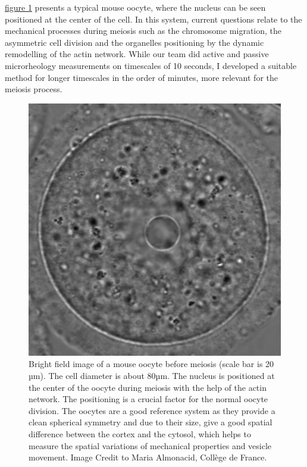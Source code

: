 \documentclass[A4paperpaper,11pt,english]{sphinxmanual}
\begin{document}
\hyperref[parts/part5:oocytewt]{figure  \ref*{parts/part5:oocytewt}} presents a typical mouse
oocyte, where the nucleus can be seen positioned at the center of the cell.
In this system, current questions relate to the mechanical processes during meiosis such as the chromosome migration,
the asymmetric cell division and the organelles positioning by the dynamic remodelling of the actin network.
While our team did active and passive microrheology measurements on timescales of 10 seconds, I developed a
suitable method  for longer timescales in the order of minutes, more relevant for the meiosis process.
\begin{figure}[htbp]
\centering
\capstart

\includegraphics[width=0.600\linewidth]{oocyte-wild-type.png}
\caption{Bright field image of a mouse oocyte before meiosis (scale bar is 20 µm).
The cell diameter is about 80µm. The nucleus is positioned at the center of
the oocyte during meiosis with the help of the actin network. The
positioning is a crucial factor for the normal oocyte division. The
oocytes are a good reference system as they provide a clean spherical
symmetry and due to their size, give a good spatial difference between the
cortex and the cytosol, which helps to measure the spatial variations of
mechanical properties and vesicle movement. Image Credit to Maria
Almonacid, Collège de France.}\label{parts/part5:oocytewt}\end{figure}
\end{document}

